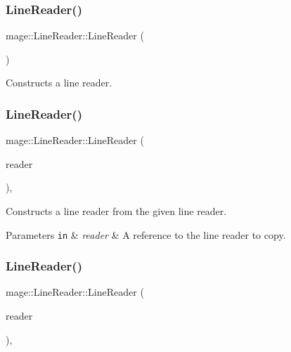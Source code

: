 \subsubsection{\texorpdfstring{Line\+Reader()}{LineReader()}\hspace{0.1cm}{\footnotesize\ttfamily [1/3]}}
{\footnotesize\ttfamily mage\+::\+Line\+Reader\+::\+Line\+Reader (\begin{DoxyParamCaption}{ }\end{DoxyParamCaption})\hspace{0.3cm}{\ttfamily [protected]}}

Constructs a line reader. \hypertarget{classmage_1_1_line_reader_ae4f871bebae110704b34c0bd88460639}{}\label{classmage_1_1_line_reader_ae4f871bebae110704b34c0bd88460639} 
\subsubsection{\texorpdfstring{Line\+Reader()}{LineReader()}\hspace{0.1cm}{\footnotesize\ttfamily [2/3]}}
{\footnotesize\ttfamily mage\+::\+Line\+Reader\+::\+Line\+Reader (\begin{DoxyParamCaption}\item[{const \hyperlink{classmage_1_1_line_reader}{Line\+Reader} \&}]{reader }\end{DoxyParamCaption})\hspace{0.3cm}{\ttfamily [protected]}, {\ttfamily [delete]}}

Constructs a line reader from the given line reader.


\begin{DoxyParams}[1]{Parameters}
\mbox{\tt in}  & {\em reader} & A reference to the line reader to copy. \\
\hline
\end{DoxyParams}
\hypertarget{classmage_1_1_line_reader_ad972c7100f726e7b061d864083ba0225}{}\label{classmage_1_1_line_reader_ad972c7100f726e7b061d864083ba0225} 
\subsubsection{\texorpdfstring{Line\+Reader()}{LineReader()}\hspace{0.1cm}{\footnotesize\ttfamily [3/3]}}
{\footnotesize\ttfamily mage\+::\+Line\+Reader\+::\+Line\+Reader (\begin{DoxyParamCaption}\item[{\hyperlink{classmage_1_1_line_reader}{Line\+Reader} \&\&}]{reader }\end{DoxyParamCaption})\hspace{0.3cm}{\ttfamily [protected]}, {\ttfamily [default]}}

